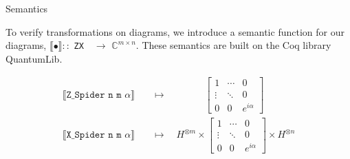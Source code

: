 \documentclass{beamer}
\newcommand{\ZX}[2]{\texttt{ZX}\,\,\text{#1}\,\,\text{#2}}
\begin{document}
\begin{frame}{Semantics}

    To verify transformations on diagrams, we introduce a semantic function for our diagrams, $\llbracket \bullet \rrbracket ::$ \ZX{n}{m} $\to$ $\mathbb{C}^{m\times n}$. These semantics are built on the Coq library QuantumLib.
    
    \begin{align*}
        \llbracket\texttt{Z_Spider n m }\alpha\rrbracket \quad &\mapsto \hspace{47pt}
        \begin{bmatrix} 
            1 & \dotsi & 0 \\ 
            \vdots & \ddots & 0 \\ 
            0 & 0 & e^{i\alpha}
        \end{bmatrix}
    \\
    \llbracket\texttt{X_Spider n m }\alpha\rrbracket  \quad &\mapsto \quad H^{\otimes m} \times 
        \begin{bmatrix} 
            1 & \dotsi & 0 \\ 
            \vdots & \ddots & 0 \\ 
            0 & 0 & e^{i\alpha}
        \end{bmatrix} \times H^{\otimes n}
    \end{align*}
\end{frame}
    
\end{document}
